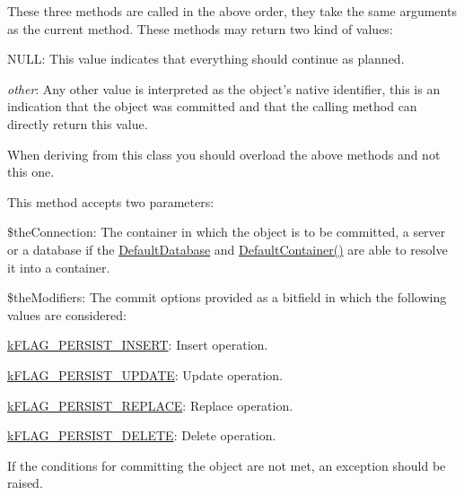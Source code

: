 These three methods are called in the above order, they take the same arguments as the current method. These methods may return two kind of values\-:


\begin{DoxyItemize}
\item {\ttfamily N\-U\-L\-L}\-: This value indicates that everything should continue as planned. 
\item {\itshape other}\-: Any other value is interpreted as the object's native identifier, this is an indication that the object was committed and that the calling method can directly return this value. 
\end{DoxyItemize}

When deriving from this class you should overload the above methods and not this one.

This method accepts two parameters\-:


\begin{DoxyItemize}
\item {\ttfamily \$the\-Connection}\-: The container in which the object is to be committed, a server or a database if the \hyperlink{class_c_persistent_document_a6092e640e36485873b70a79db464e0ff}{Default\-Database} and \hyperlink{class_c_persistent_document_ada019252d242b5a88a26b82a18e29ed6}{Default\-Container()} are able to resolve it into a container. 
\item {\ttfamily \$the\-Modifiers}\-: The commit options provided as a bitfield in which the following values are considered\-: 
\begin{DoxyItemize}
\item {\ttfamily \hyperlink{}{k\-F\-L\-A\-G\-\_\-\-P\-E\-R\-S\-I\-S\-T\-\_\-\-I\-N\-S\-E\-R\-T}}\-: Insert operation. 
\item {\ttfamily \hyperlink{}{k\-F\-L\-A\-G\-\_\-\-P\-E\-R\-S\-I\-S\-T\-\_\-\-U\-P\-D\-A\-T\-E}}\-: Update operation. 
\item {\ttfamily \hyperlink{}{k\-F\-L\-A\-G\-\_\-\-P\-E\-R\-S\-I\-S\-T\-\_\-\-R\-E\-P\-L\-A\-C\-E}}\-: Replace operation. 
\item {\ttfamily \hyperlink{}{k\-F\-L\-A\-G\-\_\-\-P\-E\-R\-S\-I\-S\-T\-\_\-\-D\-E\-L\-E\-T\-E}}\-: Delete operation. 
\end{DoxyItemize}
\end{DoxyItemize}

If the conditions for committing the object are not met, an exception should be raised.



